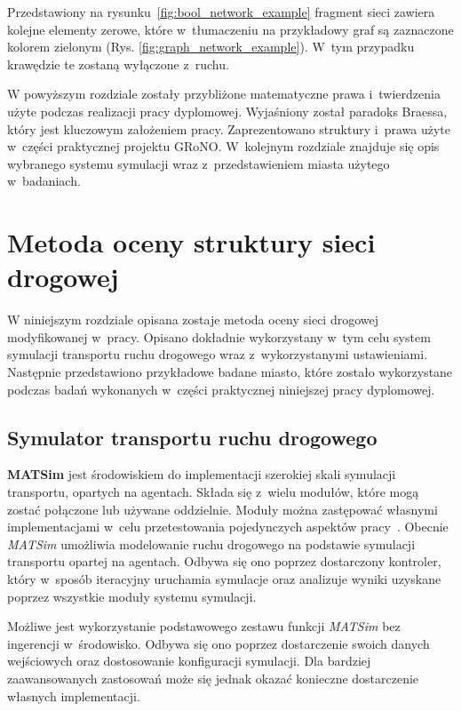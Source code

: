 \documentclass[twoside,12pt]{report}
\let\oldsection\chapter
\def\chapter{\cleardoublepage\oldsection}
\begin{document}
Przedstawiony na rysunku~\ref{fig:bool_network_example} fragment sieci zawiera kolejne elementy zerowe, które w~tłumaczeniu na przykładowy graf są zaznaczone kolorem zielonym (Rys. \ref{fig:graph_network_example}). W~tym przypadku krawędzie te zostaną wyłączone z~ruchu.

W powyższym rozdziale zostały przybliżone matematyczne prawa i~twierdzenia użyte podczas realizacji pracy dyplomowej. Wyjaśniony został paradoks Braessa, który jest kluczowym założeniem pracy. Zaprezentowano struktury i~prawa użyte w~części praktycznej projektu GRoNO. W~kolejnym rozdziale znajduje się opis wybranego systemu symulacji wraz z~przedstawieniem miasta użytego w~badaniach.

\chapter{Metoda oceny struktury sieci drogowej}\label{rozdz.technologie} 
W niniejszym rozdziale opisana zostaje metoda oceny sieci drogowej modyfikowanej w~pracy. Opisano dokładnie wykorzystany w~tym celu system symulacji transportu ruchu drogowego wraz z~wykorzystanymi ustawieniami. Następnie przedstawiono przykładowe badane miasto, które zostało wykorzystane podczas badań wykonanych w~części praktycznej niniejszej pracy dyplomowej.

\section{Symulator transportu ruchu drogowego}
\textbf{MATSim} jest środowiskiem do implementacji szerokiej skali symulacji transportu, opartych na agentach. Składa się z~wielu modułów, które mogą zostać połączone lub używane oddzielnie. Moduły można zastępować własnymi implementacjami w~celu przetestowania pojedynczych aspektów pracy~\cite{matsim}. Obecnie \textit{MATSim} umożliwia modelowanie ruchu drogowego na podstawie symulacji transportu opartej na agentach. Odbywa się ono poprzez dostarczony kontroler, który w~sposób iteracyjny uruchamia symulacje oraz analizuje wyniki uzyskane poprzez wszystkie moduły systemu symulacji.

Możliwe jest wykorzystanie podstawowego zestawu funkcji \textit{MATSim} bez ingerencji w~środowisko. Odbywa się ono poprzez dostarczenie swoich danych wejściowych oraz dostosowanie konfiguracji symulacji. Dla bardziej zaawansowanych zastosowań może się jednak okazać konieczne dostarczenie własnych implementacji.
\end{document}
